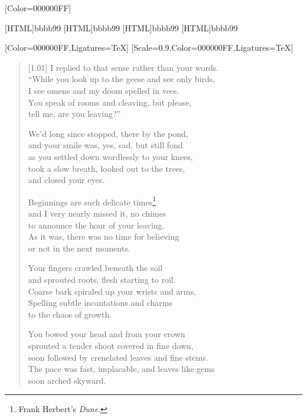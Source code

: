 \renewfontfamily{}[Color=000000FF]

[HTML]{bbbb99}
[HTML]{bbbb99}
[HTML]{bbbb99}
[HTML]{bbbb99}
\begin{paracol}{2}
  \begin{leftcolumn}
[Color=000000FF,Ligatures=TeX]
\renewfontfamily{}[Scale=0.9,Color=000000FF,Ligatures=TeX]

\begin{verse}[1.01\textwidth]
I replied to that sense rather than your words.\\
``While you look up to the geese and see only birds,\\
I see omens and my doom spelled in vees.\\
You speak of rooms and cleaving, but please,\\
tell me, are you leaving?''

We'd long since stopped, there by the pond,\\
and your smile was, yes, sad, but still fond\\
as you settled down wordlessly to your knees,\\
took a slow breath, looked out to the trees,\\
and closed your eyes.

Beginnings are such delicate times\footnote{Frank Herbert's \emph{Dune}.}\\
and I very nearly missed it, no chimes\\
to announce the hour of your leaving.\\
As it was, there was no time for believing\\
or not in the next moments.

Your fingers crawled beneath the soil\\
and sprouted roots, flesh starting to roil.\\
Coarse bark spiraled up your wrists and arms,\\
Spelling subtle incantations and charms\\
to the chaos of growth.

You bowed your head and from your crown\\
sprouted a tender shoot covered in fine down,\\
soon followed by crenelated leaves and fine stems.\\
The pace was fast, implacable, and leaves like gems\\
soon arched skyward.
\end{verse}
\newpage
\end{leftcolumn}
\end{paracol}

